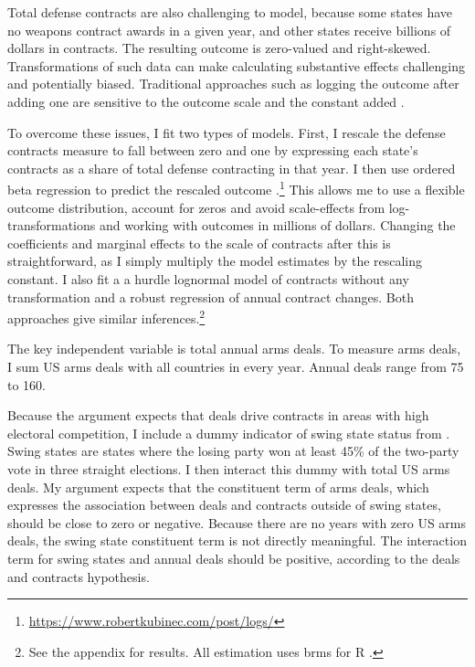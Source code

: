 \documentclass[12pt]{article}
\begin{document}
Total defense contracts are also challenging to model, because some states have no weapons contract awards in a given year, and other states receive billions of dollars in contracts. 
The resulting outcome is zero-valued and right-skewed. 
Transformations of such data can make calculating substantive effects challenging and potentially biased. 
Traditional approaches such as logging the outcome after adding one are sensitive to the outcome scale and the constant added \citep{ChenRoth2022, MullahyNorton2022}. 


To overcome these issues, I fit two types of models.
First, I rescale the defense contracts measure to fall between zero and one by expressing each state's contracts as a share of total defense contracting in that year.
I then use ordered beta regression to predict the rescaled outcome \citep{Kubinec2022}.\footnote{\url{https://www.robertkubinec.com/post/logs/}} 
This allows me to use a flexible outcome distribution, account for zeros and avoid scale-effects from log-transformations and working with outcomes in millions of dollars. 
Changing the coefficients and marginal effects to the scale of contracts after this is straightforward, as I simply multiply the model estimates by the rescaling constant.
I also fit a a hurdle lognormal model of contracts without any transformation and a robust regression of annual contract changes. 
Both approaches give similar inferences.\footnote{See the appendix for results. All estimation uses brms for \textsf{R} \citep{Buerkner2017}.} 


The key independent variable is total annual arms deals.  
To measure arms deals, I sum US arms deals with all countries in every year. 
Annual deals range from 75 to 160. 


Because the argument expects that deals drive contracts in areas with high electoral competition, I include a dummy indicator of swing state status from \citet{KrinerReeves2015}.
Swing states are states where the losing party won at least 45\% of the two-party vote in three straight elections. 
I then interact this dummy with total US arms deals. 
My argument expects that the constituent term of arms deals, which expresses the association between deals and contracts outside of swing states, should be close to zero or negative.
Because there are no years with zero US arms deals, the swing state constituent term is not directly meaningful.  
The interaction term for swing states and annual deals should be positive, according to the deals and contracts hypothesis.
\end{document}

